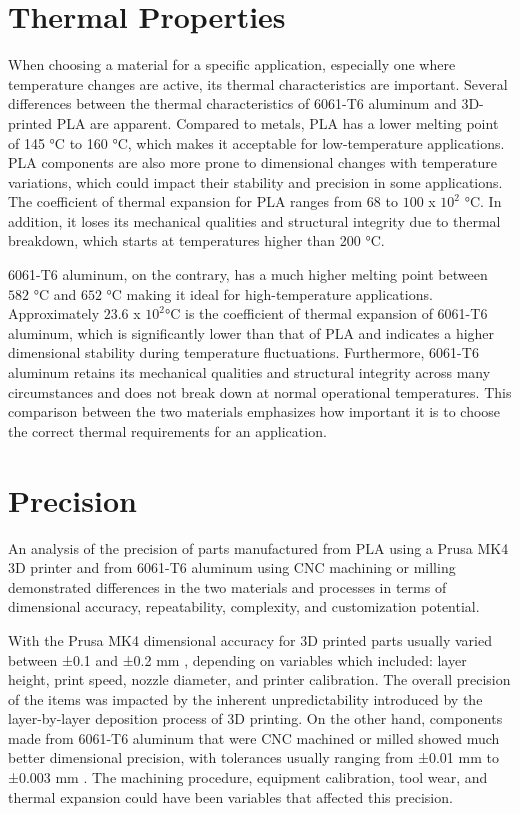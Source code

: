 \section{Thermal Properties}

    When choosing a material for a specific application, especially one where temperature changes are
    active, its thermal characteristics are important. Several differences between the thermal
    characteristics of 6061-T6 aluminum and 3D-printed PLA are apparent. Compared to metals, PLA has a
    lower melting point of 145 °C to 160 °C, which makes it acceptable for low-temperature applications. PLA
    components are also more prone to dimensional changes with temperature variations, which could
    impact their stability and precision in some applications. The coefficient of thermal expansion \cite{pla_spec_ultimaker} for PLA
    ranges from 68 to \(100\) x \(10^2\) °C. In addition, it loses its mechanical qualities and structural integrity due
    to thermal breakdown, which starts at temperatures higher than 200 °C.

    6061-T6 aluminum, on the contrary, has a much higher melting point between \(582\) °C and \(652\) °C making it ideal for high-temperature applications. Approximately \(23.6\) x \(10^2\)°C is the coefficient of
    thermal expansion of 6061-T6 aluminum, which is significantly lower than that of PLA and indicates a higher dimensional stability during temperature fluctuations. Furthermore, 6061-T6 aluminum retains its
    mechanical qualities and structural integrity across many circumstances and does not break down at
    normal operational temperatures. This comparison between the two materials emphasizes how important it is to choose the correct thermal requirements for an application. \cite{aluminum_spec}

\section{Precision}

    An analysis of the precision of parts manufactured from PLA using a Prusa MK4 3D printer and from
    6061-T6 aluminum using CNC machining or milling demonstrated differences in the two materials and
    processes in terms of dimensional accuracy, repeatability, complexity, and customization potential.

    With the Prusa MK4 dimensional accuracy for 3D printed parts usually varied between ±0.1 and ±0.2 mm \cite{prusa_mk4_precision},
    depending on variables which included: layer height, print speed, nozzle diameter, and printer calibration.
    The overall precision of the items was impacted by the inherent unpredictability introduced by the layer-by-layer deposition process of 3D printing. On the other hand, components made from 6061-T6 aluminum
    that were CNC machined or milled showed much better dimensional precision, with tolerances usually
    ranging from ±0.01 mm to ±0.003 mm \cite{cnc_milling_precision}. The machining procedure, equipment calibration, tool wear, and
    thermal expansion could have been variables that affected this precision.


